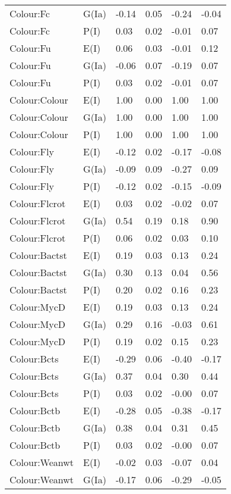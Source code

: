 \begin{center}
\begin{longtable}{|p{1.1in}|p{0.7in}|p{0.7in}|p{0.6in}|p{0.6in}|p{0.6in}|}
  Colour:Fc & G(Ia) & -0.14 & 0.05 & -0.24 & -0.04 \\ 
  Colour:Fc & P(I) & 0.03 & 0.02 & -0.01 & 0.07 \\ 
  Colour:Fu & E(I) & 0.06 & 0.03 & -0.01 & 0.12 \\ 
  Colour:Fu & G(Ia) & -0.06 & 0.07 & -0.19 & 0.07 \\ 
  Colour:Fu & P(I) & 0.03 & 0.02 & -0.01 & 0.07 \\ 
  Colour:Colour & E(I) & 1.00 & 0.00 & 1.00 & 1.00 \\ 
  Colour:Colour & G(Ia) & 1.00 & 0.00 & 1.00 & 1.00 \\ 
  Colour:Colour & P(I) & 1.00 & 0.00 & 1.00 & 1.00 \\ 
  Colour:Fly & E(I) & -0.12 & 0.02 & -0.17 & -0.08 \\ 
  Colour:Fly & G(Ia) & -0.09 & 0.09 & -0.27 & 0.09 \\ 
  Colour:Fly & P(I) & -0.12 & 0.02 & -0.15 & -0.09 \\ 
  Colour:Flcrot & E(I) & 0.03 & 0.02 & -0.02 & 0.07 \\ 
  Colour:Flcrot & G(Ia) & 0.54 & 0.19 & 0.18 & 0.90 \\ 
  Colour:Flcrot & P(I) & 0.06 & 0.02 & 0.03 & 0.10 \\ 
  Colour:Bactst & E(I) & 0.19 & 0.03 & 0.13 & 0.24 \\ 
  Colour:Bactst & G(Ia) & 0.30 & 0.13 & 0.04 & 0.56 \\ 
  Colour:Bactst & P(I) & 0.20 & 0.02 & 0.16 & 0.23 \\ 
  Colour:MycD & E(I) & 0.19 & 0.03 & 0.13 & 0.24 \\ 
  Colour:MycD & G(Ia) & 0.29 & 0.16 & -0.03 & 0.61 \\ 
  Colour:MycD & P(I) & 0.19 & 0.02 & 0.15 & 0.23 \\ 
  Colour:Bcts & E(I) & -0.29 & 0.06 & -0.40 & -0.17 \\ 
  Colour:Bcts & G(Ia) & 0.37 & 0.04 & 0.30 & 0.44 \\ 
  Colour:Bcts & P(I) & 0.03 & 0.02 & -0.00 & 0.07 \\ 
  Colour:Bctb & E(I) & -0.28 & 0.05 & -0.38 & -0.17 \\ 
  Colour:Bctb & G(Ia) & 0.38 & 0.04 & 0.31 & 0.45 \\ 
  Colour:Bctb & P(I) & 0.03 & 0.02 & -0.00 & 0.07 \\ 
  Colour:Weanwt & E(I) & -0.02 & 0.03 & -0.07 & 0.04 \\ 
  Colour:Weanwt & G(Ia) & -0.17 & 0.06 & -0.29 & -0.05 \\ 

\end{longtable}
\end{center}

